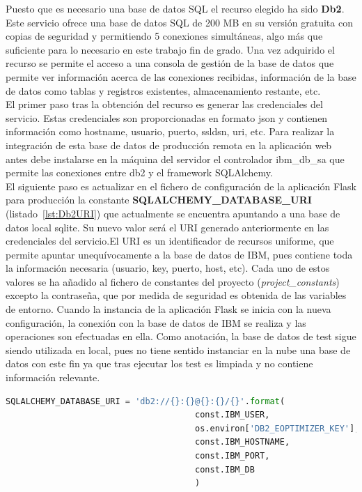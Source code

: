 Puesto que es necesario una base de datos SQL el recurso elegido ha sido \textbf{Db2}. Este servicio ofrece una base de datos SQL de 200 MB en su versión gratuita con copias de seguridad y permitiendo 5 conexiones simultáneas, algo más que suficiente para lo necesario en este trabajo fin de grado. Una vez adquirido el recurso se permite el acceso a una consola de gestión de la base de datos que permite ver información acerca de las conexiones recibidas, información de la base de datos como tablas y registros existentes, almacenamiento restante, etc.\\El primer paso tras la obtención del recurso es generar las credenciales del servicio. Estas credenciales son proporcionadas en formato json y contienen información como hostname, usuario, puerto, ssldsn, uri, etc. Para realizar la integración de esta base de datos de producción remota en la aplicación web antes debe instalarse en la máquina del servidor el controlador ibm\_db\_sa que permite las conexiones entre db2 y el framework SQLAlchemy.\\El siguiente paso es actualizar en el fichero de configuración de la aplicación Flask para producción la constante \textbf{SQLALCHEMY\_DATABASE\_URI} (listado~\ref{lst:Db2URI}) que actualmente se encuentra apuntando a una base de datos local sqlite. Su nuevo valor será el URI generado anteriormente en las credenciales del servicio.El URI es un identificador de recursos uniforme, que permite apuntar unequívocamente a la base de datos de IBM, pues contiene toda la información necesaria (usuario, key, puerto, host, etc). Cada uno de estos valores se ha añadido al fichero de constantes del proyecto (\textit{project\_constants}) excepto la contraseña, que por medida de seguridad es obtenida de las variables de entorno. Cuando la instancia de la aplicación Flask se inicia con la nueva configuración, la conexión con la base de datos de IBM se realiza y las operaciones son efectuadas en ella. Como anotación, la base de datos de test sigue siendo utilizada en local, pues no tiene sentido instanciar en la nube una base de datos con este fin ya que tras ejecutar los test es limpiada y no contiene información relevante.\\
\begin{lstlisting}[language=Python,float=ht,numbers=none,caption={URI de Db2 para SQLAlchemy en \textit{prod\_config}},label={lst:Db2URI}]
SQLALCHEMY_DATABASE_URI = 'db2://{}:{}@{}:{}/{}'.format(
                                      const.IBM_USER,
                                      os.environ['DB2_EOPTIMIZER_KEY'],
                                      const.IBM_HOSTNAME,
                                      const.IBM_PORT,
                                      const.IBM_DB
                                      )
\end{lstlisting}


